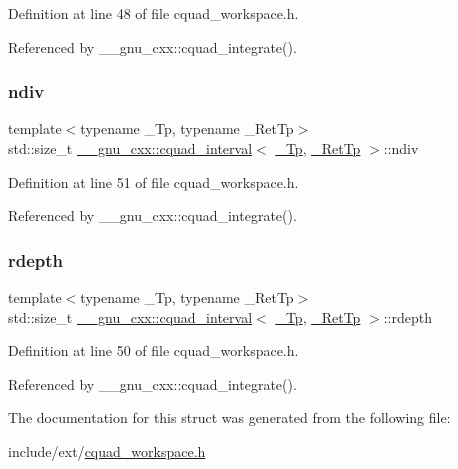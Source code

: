 Definition at line 48 of file cquad\+\_\+workspace.\+h.



Referenced by \+\_\+\+\_\+gnu\+\_\+cxx\+::cquad\+\_\+integrate().

\mbox{\label{struct____gnu__cxx_1_1cquad__interval_a79dbc370bba05fb7449645054889d308}} 
\subsubsection{\texorpdfstring{ndiv}{ndiv}}
{\footnotesize\ttfamily template$<$typename \+\_\+\+Tp, typename \+\_\+\+Ret\+Tp$>$ \\
std\+::size\+\_\+t \hyperlink{struct____gnu__cxx_1_1cquad__interval}{\+\_\+\+\_\+gnu\+\_\+cxx\+::cquad\+\_\+interval}$<$ \hyperlink{namespace____gnu__cxx_a3b19a9c800ca194374ef9172290f7d79}{\+\_\+\+Tp}, \hyperlink{namespace____gnu__cxx_a886e03ece3d53ff7fa6c098a40f93fa5}{\+\_\+\+Ret\+Tp} $>$\+::ndiv}



Definition at line 51 of file cquad\+\_\+workspace.\+h.



Referenced by \+\_\+\+\_\+gnu\+\_\+cxx\+::cquad\+\_\+integrate().

\mbox{\label{struct____gnu__cxx_1_1cquad__interval_a82e60c6a4a1c360f09829fb6480e2888}} 
\subsubsection{\texorpdfstring{rdepth}{rdepth}}
{\footnotesize\ttfamily template$<$typename \+\_\+\+Tp, typename \+\_\+\+Ret\+Tp$>$ \\
std\+::size\+\_\+t \hyperlink{struct____gnu__cxx_1_1cquad__interval}{\+\_\+\+\_\+gnu\+\_\+cxx\+::cquad\+\_\+interval}$<$ \hyperlink{namespace____gnu__cxx_a3b19a9c800ca194374ef9172290f7d79}{\+\_\+\+Tp}, \hyperlink{namespace____gnu__cxx_a886e03ece3d53ff7fa6c098a40f93fa5}{\+\_\+\+Ret\+Tp} $>$\+::rdepth}



Definition at line 50 of file cquad\+\_\+workspace.\+h.



Referenced by \+\_\+\+\_\+gnu\+\_\+cxx\+::cquad\+\_\+integrate().



The documentation for this struct was generated from the following file\+:\begin{DoxyCompactItemize}
\item 
include/ext/\hyperlink{cquad__workspace_8h}{cquad\+\_\+workspace.\+h}\end{DoxyCompactItemize}
